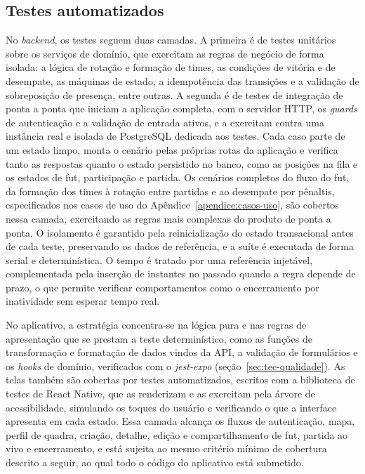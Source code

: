     \subsection{Testes automatizados}
      No \textit{backend}, os testes seguem duas camadas. A primeira é de testes unitários sobre os serviços de domínio, que exercitam as regras de negócio de forma isolada: a lógica de rotação e formação de times, as condições de vitória e de desempate, as máquinas de estado, a idempotência das transições e a validação de sobreposição de presença, entre outras. A segunda é de testes de integração de ponta a ponta que iniciam a aplicação completa, com o servidor HTTP, os \textit{guards} de autenticação e a validação de entrada ativos, e a exercitam contra uma instância real e isolada de PostgreSQL dedicada aos testes. Cada caso parte de um estado limpo, monta o cenário pelas próprias rotas da aplicação e verifica tanto as respostas quanto o estado persistido no banco, como as posições na fila e os estados de fut, participação e partida. Os cenários completos do fluxo do fut, da formação dos times à rotação entre partidas e ao desempate por pênaltis, especificados nos casos de uso do Apêndice~\ref{apendice:casos-uso}, são cobertos nessa camada, exercitando as regras mais complexas do produto de ponta a ponta. O isolamento é garantido pela reinicialização do estado transacional antes de cada teste, preservando os dados de referência, e a suíte é executada de forma serial e determinística. O tempo é tratado por uma referência injetável, complementada pela inserção de instantes no passado quando a regra depende de prazo, o que permite verificar comportamentos como o encerramento por inatividade sem esperar tempo real.

      No aplicativo, a estratégia concentra-se na lógica pura e nas regras de apresentação que se prestam a teste determinístico, como as funções de transformação e formatação de dados vindos da API, a validação de formulários e os \textit{hooks} de domínio, verificados com o \textit{jest-expo} (seção~\ref{sec:tec-qualidade}). As telas também são cobertas por testes automatizados, escritos com a biblioteca de testes de React Native, que as renderizam e as exercitam pela árvore de acessibilidade, simulando os toques do usuário e verificando o que a interface apresenta em cada estado. Essa camada alcança os fluxos de autenticação, mapa, perfil de quadra, criação, detalhe, edição e compartilhamento de fut, partida ao vivo e encerramento, e está sujeita ao mesmo critério mínimo de cobertura descrito a seguir, ao qual todo o código do aplicativo está submetido.

